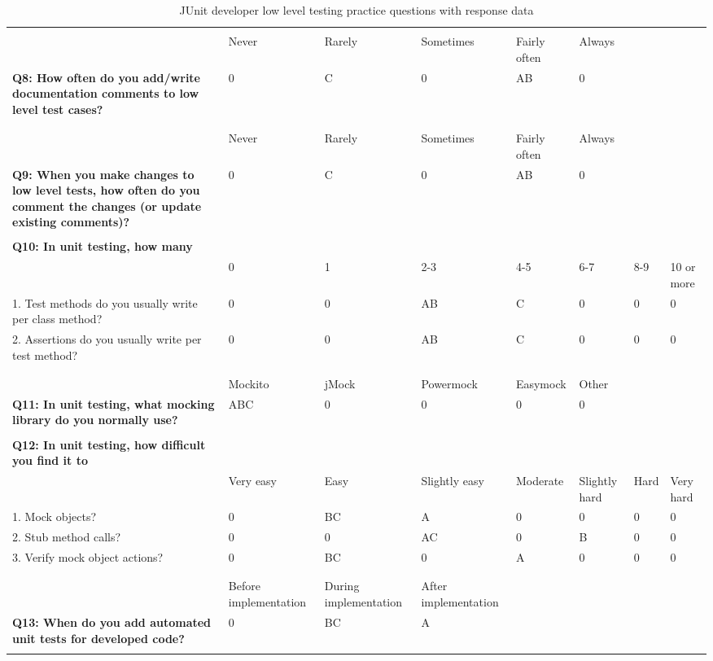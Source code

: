 \begin{table}
{\begin{tabular}{p{20.0cm}*{7}{p{2.0cm}}}
            & & & & & & \\
            & Never & Rarely & Sometimes & Fairly often & Always & & \\
            \textbf{Q8: How often do you add/write documentation comments to low level test cases?} & 0 & C & 0 & AB & 0 \\
            & \\ \hline

            & & & & & & \\
            & Never & Rarely & Sometimes & Fairly often & Always & & \\
            \textbf{Q9: When you make changes to low level tests, how often do you comment the changes (or update existing comments)?} & 0 & C & 0 & AB & 0 \\
            & \\ \hline

            \textbf{Q10: In unit testing, how many} & & & & & & \\
            & 0 & 1 & 2-3 & 4-5 & 6-7 &  8-9 & 10 or more \\
            1. Test methods do you usually write per class method? & 0 & 0 & AB & C & 0 & 0 & 0 \\
            2. Assertions do you usually write per test method? & 0 & 0 & AB & C & 0 & 0 & 0 \\
            & \\ \hline

            & & & & & & \\
            & Mockito & jMock & Powermock & Easymock & Other & & \\
            \textbf{Q11: In unit testing, what mocking library do you normally use?} & ABC & 0 & 0 & 0 & 0 \\
            & \\ \hline

            \textbf{Q12: In unit testing, how difficult you find it to} & & & & & & \\
            & Very easy & Easy & Slightly easy & Moderate & Slightly hard & Hard & Very hard \\
            1. Mock objects? & 0 & BC & A & 0 & 0 & 0 & 0 \\
            2. Stub method calls? & 0 & 0 & AC & 0 & B & 0 & 0 \\
            3. Verify mock object actions? & 0 & BC & 0 & A & 0 & 0 & 0 \\
            & \\ \hline

            & & & & & & \\
            & Before implementation & During implementation & After implementation & \\
            \textbf{Q13: When do you add automated unit tests for developed code?} & 0 & BC & A \\
            & \\ \hline

            \end{tabular}}
            \caption {JUnit developer low level testing practice questions with response data} \label{tab:junit-pt1-ans}
    \end{table}
